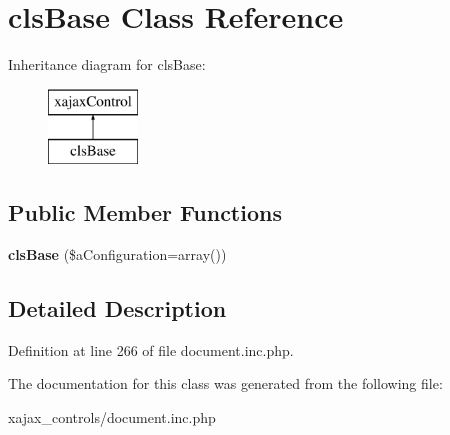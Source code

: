 \hypertarget{classclsBase}{
\section{clsBase Class Reference}
\label{classclsBase}
}
Inheritance diagram for clsBase:\begin{figure}[H]
\begin{center}
\leavevmode
\includegraphics[height=2.000000cm]{classclsBase}
\end{center}
\end{figure}
\subsection*{Public Member Functions}
\begin{DoxyCompactItemize}
\item 
\hypertarget{classclsBase_aff15e1d4374ad0304abb55de881d7e66}{
{\bfseries clsBase} (\$aConfiguration=array())}
\label{classclsBase_aff15e1d4374ad0304abb55de881d7e66}

\end{DoxyCompactItemize}


\subsection{Detailed Description}


Definition at line 266 of file document.inc.php.



The documentation for this class was generated from the following file:\begin{DoxyCompactItemize}
\item 
xajax\_\-controls/document.inc.php\end{DoxyCompactItemize}
